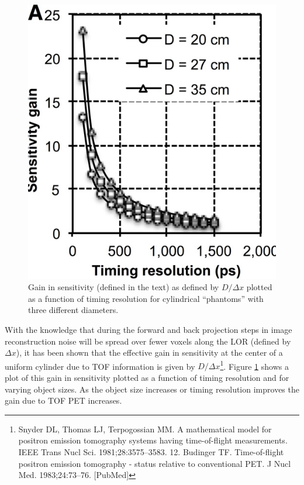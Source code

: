 \begin{figure}[!bhtp]
	\centering
	\includegraphics[scale=0.5]{img/SensiTof.png}
	\caption{\label{fig.sensi} Gain in sensitivity (defined in the text) as defined by $D/\Delta x$ plotted as a function of timing resolution for cylindrical ``phantoms'' with three different diameters.}
\end{figure}

With the knowledge that during the forward and back projection steps in image reconstruction noise will be spread over fewer voxels along the LOR (defined by $\Delta x$), it has been  shown  that the effective gain in sensitivity at the center of a uniform cylinder due to TOF information is given by $D/\Delta x$\footnote{ Snyder DL, Thomas LJ, Terpogossian MM. A mathematical model for positron emission tomography systems having time-of-flight measurements. IEEE Trans Nucl Sci. 1981;28:3575–3583.
12. Budinger TF. Time-of-flight positron emission tomography - status relative to conventional PET. J Nucl Med. 1983;24:73–76. [PubMed]}. Figure \ref{fig.sensi} shows a plot of this gain in sensitivity plotted as a function of timing resolution and for varying object sizes. As the object size increases or timing resolution improves the gain due to TOF PET increases. 

